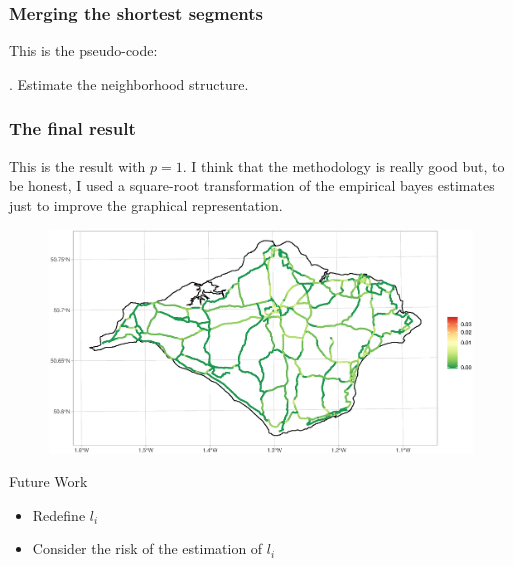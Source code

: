 \documentclass[c,10pt,pdftex]{beamer}
\begin{document}
\begin{frame}[fragile]
\frametitle{Merging the shortest segments}
\vspace{-0.5cm}
This is the pseudo-code:

\begin{algorithm}[H]
	\begin{algorithmic}[1]
		. 
		\STATE Estimate the neighborhood structure. 
		\ENDWHILE
	\end{algorithmic}
\end{algorithm}
\end{frame}

\begin{frame}
\vspace{-0.25cm}
\frametitle{The final result}
This is the result with $p = 1$. I think that the methodology is really good but, to be honest, I used a square-root transformation of the empirical bayes estimates just to improve the graphical representation. 
\begin{figure}
	\centering
	\includegraphics[width=\linewidth]{images/empirical_bayes_2}
\end{figure}
\end{frame}


\begin{frame}{Future Work}
\begin{itemize}
	\setlength\itemsep{1em}
	\item Redefine $l_i$
	\item Consider the risk of the estimation of $l_i$
\end{itemize}
\end{frame}
\end{document}
